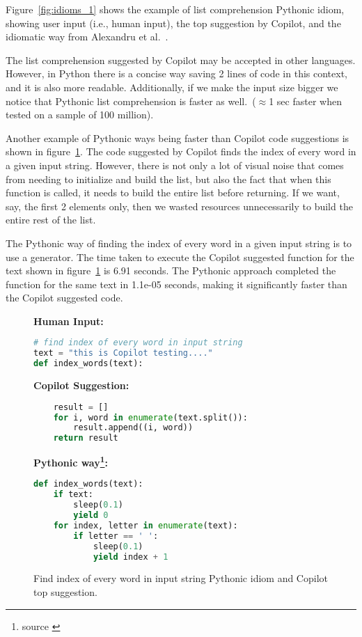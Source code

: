 Figure~\ref{fig:idioms_1} shows the example of list comprehension Pythonic idiom, showing user input (i.e., human input), the top suggestion by Copilot, and the idiomatic way from Alexandru et al.~\cite{Alexandru2018}.

The list comprehension suggested by Copilot may be accepted in other languages. 
However, in Python there is a concise way saving 2 lines of code in this context, and it is also more readable. 
Additionally, if we make the input size bigger we notice that Pythonic list comprehension is faster as well.~($\approx$1 sec faster when tested on a sample of 100 million).

Another example of Pythonic ways being faster than Copilot code suggestions is shown in figure~\ref{fig:idioms_3}.
The code suggested by Copilot finds the index of every word in a given input string. 
However, there is not only a lot of visual noise that comes from needing to initialize and build the list, but also the fact that when this function is called, it needs to build the entire list before returning. 
If we want, say, the first 2 elements only, then we wasted resources unnecessarily to build the entire rest of the list.

The Pythonic way of finding the index of every word in a given input string is to use a generator. 
The time taken to execute the Copilot suggested function for the text shown in figure~\ref{fig:idioms_3} is 6.91 seconds. The Pythonic approach completed the function for the same text in 1.1e-05 seconds, making it significantly faster than the Copilot suggested code.

\begin{figure}[hbt!]
    \centering
\begin{tcolorbox}[title=Find index of every word in input string,boxsep=.25mm]
\textbf{Human Input:}
\begin{lstlisting}[language={Python}, keywords={yield}]
# find index of every word in input string
text = "this is Copilot testing...."
def index_words(text):
\end{lstlisting}
\tcbline
\textbf{Copilot Suggestion:}
\begin{lstlisting}[language=Python,escapechar=\%]
% \noindent\textcolor{gray}{def index\_words(text):} %
    result = []
    for i, word in enumerate(text.split()):
		result.append((i, word))
	return result
\end{lstlisting}
\tcbline
\textbf{Pythonic way\footnote{source \cite{Alexandru2018}}:}
\begin{lstlisting}[language=Python, keywords={def, if, for, in, yield}]
def index_words(text):
    if text:
        sleep(0.1)
        yield 0
    for index, letter in enumerate(text):
        if letter == ' ':
            sleep(0.1)
            yield index + 1
\end{lstlisting}
\end{tcolorbox}
    \caption{Find index of every word in input string Pythonic idiom and Copilot top suggestion.}
    \label{fig:idioms_3}
\end{figure}

